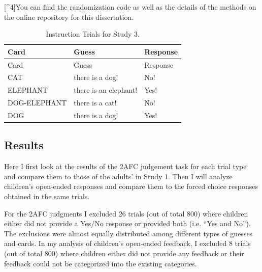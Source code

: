 \documentclass[oneside]{report}
\theoremstyle{definition}
\theoremstyle{definition}
\theoremstyle{definition}
\theoremstyle{remark}
\begin{document}
{[}\^{}4{]}You can find the randomization code as well as the details of
the methods on the online repository for this dissertation.
\begin{longtable}[]{@{}lll@{}}
\caption{\label{tab:instructionStudy3} Instruction Trials for Study
3.}\tabularnewline
\toprule
Card & Guess & Response\tabularnewline
\midrule
\endfirsthead
\toprule
Card & Guess & Response\tabularnewline
\midrule
\endhead
CAT & there is a dog! & No!\tabularnewline
ELEPHANT & there is an elephant! & Yes!\tabularnewline
DOG-ELEPHANT & there is a cat! & No!\tabularnewline
DOG & there is a dog! & Yes!\tabularnewline
\bottomrule
\end{longtable}
\subsection{Results}\label{results-2}

Here I first look at the results of the 2AFC judgement task for each
trial type and compare them to those of the adults' in Study 1. Then I
will analyze children's open-ended responses and compare them to the
forced choice responses obtained in the same trials.

For the 2AFC judgments I excluded 26 trials (out of total 800) where
children either did not provide a Yes/No response or provided both (i.e.
``Yes and No''). The exclusions were almost equally distributed among
different types of guesses and cards. In my analysis of children's
open-ended feedback, I excluded 8 trials (out of total 800) where
children either did not provide any feedback or their feedback could not
be categorized into the existing categories.
\end{document}
